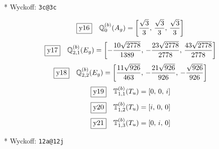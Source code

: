 \documentclass[fleqn,10pt,landscape]{jsarticle}
\begin{document}
\noindent ** Wyckoff: \texttt{3c@3c}

\begin{dmath*}
\fbox{y16}\quad \mathbb{Q}_{0}^{(b)}(A_{g})=\left[ \frac{\sqrt{3}}{3},\, \frac{\sqrt{3}}{3},\, \frac{\sqrt{3}}{3} \right]
\end{dmath*}
\begin{dmath*}
\fbox{y17}\quad \mathbb{Q}_{2,1}^{(b)}(E_{g})=\left[ - \frac{10 \sqrt{2778}}{1389},\, - \frac{23 \sqrt{2778}}{2778},\, \frac{43 \sqrt{2778}}{2778} \right]
\end{dmath*}
\begin{dmath*}
\fbox{y18}\quad \mathbb{Q}_{2,2}^{(b)}(E_{g})=\left[ \frac{11 \sqrt{926}}{463},\, - \frac{21 \sqrt{926}}{926},\, - \frac{\sqrt{926}}{926} \right]
\end{dmath*}
\begin{dmath*}
\fbox{y19}\quad \mathbb{T}_{1,1}^{(b)}(T_{u})=\left[ 0,\, 0,\, i \right]
\end{dmath*}
\begin{dmath*}
\fbox{y20}\quad \mathbb{T}_{1,2}^{(b)}(T_{u})=\left[ i,\, 0,\, 0 \right]
\end{dmath*}
\begin{dmath*}
\fbox{y21}\quad \mathbb{T}_{1,3}^{(b)}(T_{u})=\left[ 0,\, i,\, 0 \right]
\end{dmath*}
\vspace{5mm}

\noindent ** Wyckoff: \texttt{12a@12j}
\end{document}
